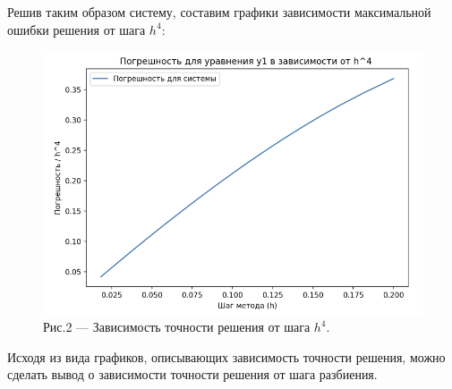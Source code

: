 \documentclass[a4paper,12pt]{article}
\begin{document}
Решив таким образом систему, составим графики зависимости максимальной ошибки решения от шага $h^4$:
\begin{figure}[h]
    \centering
    \includegraphics[width=0.5\linewidth]{pictures/testTask.png}
    \captionsetup{labelformat=empty}
    \caption{Рис.2 --- Зависимость точности решения от шага $h^4$.}
\end{figure}

Исходя из вида графиков, описывающих зависимость точности решения, можно сделать вывод
о зависимости точности решения от шага разбиения. 

\newpage
\end{document}
